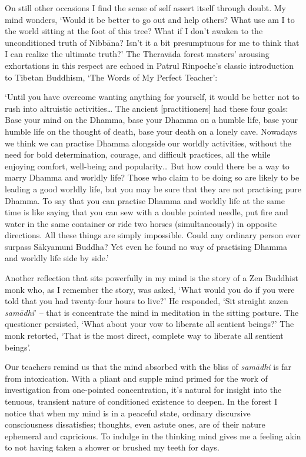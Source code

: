 On still other occasions I find the sense of self assert itself through
doubt. My mind wonders, `Would it be better to go out and help others? 
What use am I to the world sitting at the foot of this tree? What if I
don't awaken to the unconditioned truth of Nibbāna? Isn't it a bit
presumptuous for me to think that I can realize the ultimate truth?' The
Theravāda forest masters' arousing exhortations in this respect are
echoed in Patrul Rinpoche's classic introduction to Tibetan Buddhism, 
`The Words of My Perfect Teacher': 

`Until you have overcome wanting anything for yourself, it would be
better not to rush into altruistic activities\ldots{} The ancient
[practitioners] had these four goals: Base your mind on the Dhamma, 
base your Dhamma on a humble life, base your humble life on the thought
of death, base your death on a lonely cave. Nowadays we think we can
practise Dhamma alongside our worldly activities, without the need for
bold determination, courage, and difficult practices, all the while
enjoying comfort, well-being and popularity\ldots{} But how could there
be a way to marry Dhamma and worldly life? Those who claim to be doing
so are likely to be leading a good worldly life, but you may be sure
that they are not practising pure Dhamma. To say that you can practise
Dhamma and worldly life at the same time is like saying that you can sew
with a double pointed needle, put fire and water in the same container
or ride two horses (simultaneously) in opposite directions. All these
things are simply impossible. Could any ordinary person ever surpass
Sākyamuni Buddha? Yet even he found no way of practising Dhamma and
worldly life side by side.'

Another reflection that sits powerfully in my mind is the story of a Zen
Buddhist monk who, as I remember the story, was asked, `What would you
do if you were told that you had twenty-four hours to live?' He
responded, `Sit straight zazen \emph{samādhi}' -- that is concentrate
the mind in meditation in the sitting posture. The questioner persisted, 
`What about your vow to liberate all sentient beings?' The monk
retorted, `That is the most direct, complete way to liberate all
sentient beings'. 

Our teachers remind us that the mind absorbed with the bliss of
\emph{samādhi} is far from intoxication. With a pliant and supple mind
primed for the work of investigation from one-pointed concentration, 
it's natural for insight into the tenuous, transient nature of
conditioned existence to deepen. In the forest I notice that when my
mind is in a peaceful state, ordinary discursive consciousness
dissatisfies; thoughts, even astute ones, are of their nature ephemeral
and capricious. To indulge in the thinking mind gives me a feeling akin
to not having taken a shower or brushed my teeth for days. 

